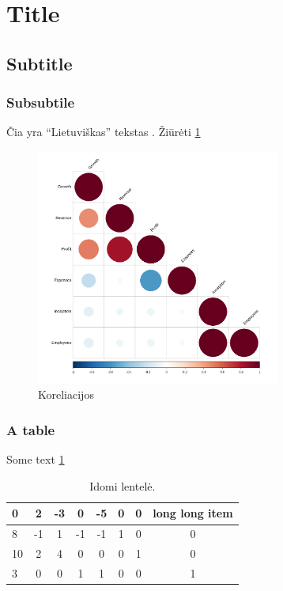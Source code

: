 \section{Title}
\subsection{Subtitle}
\subsubsection{Subsubtile}

Čia yra \enquote{Lietuviškas} tekstas \cite{Badr_2019}. Žiūrėti \ref{fig:excorr}

\begin{figure}[H]
	\centering
	\includegraphics[width=8cm]{images/corr-norm.png}
	\caption{Koreliacijos}
	\label{fig:excorr}
\end{figure}

\subsubsection{A table}

Some text \ref{tab:example-table}

\begin{table}[H]
	\centering
	\caption{Idomi lentelė.}
	\label{tab:example-table}
	\begin{tabular}{@{}lccccccc@{}}
		\toprule
		0  & 2  & -3 & 0  & -5 & 0 & 0 & long long item \\ \midrule
		8  & -1 & 1  & -1 & -1 & 1 & 0 & 0              \\
		10 & 2  & 4  & 0  & 0  & 0 & 1 & 0              \\
		3  & 0  & 0  & 1  & 1  & 0 & 0 & 1              \\ \bottomrule
	\end{tabular}
\end{table}

